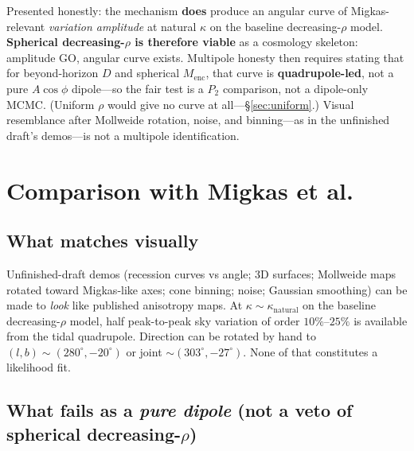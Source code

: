 \documentclass[11pt,a4paper]{article}
\begin{document}
Presented honestly: the mechanism \textbf{does} produce an angular curve of Migkas-relevant \emph{variation amplitude} at natural \(\kappa\) on the baseline decreasing-\(\rho\) model. \textbf{Spherical decreasing-\(\rho\) is therefore viable} as a cosmology skeleton: amplitude GO, angular curve exists. Multipole honesty then requires stating that for beyond-horizon \(D\) and spherical \(M_{\mathrm{enc}}\), that curve is \textbf{quadrupole-led}, not a pure \(A\cos\phi\) dipole---so the fair test is a \(P_2\) comparison, not a dipole-only MCMC. (Uniform \(\rho\) would give no curve at all---\S\ref{sec:uniform}.) Visual resemblance after Mollweide rotation, noise, and binning---as in the unfinished draft's demos---is not a multipole identification.

\section{Comparison with Migkas et al.}

\subsection{What matches visually}

Unfinished-draft demos (recession curves vs angle; 3D surfaces; Mollweide maps rotated toward Migkas-like axes; cone binning; noise; Gaussian smoothing) can be made to \emph{look} like published anisotropy maps. At \(\kappa\sim\kappa_{\mathrm{natural}}\) on the baseline decreasing-\(\rho\) model, half peak-to-peak sky variation of order \(10\%\)--\(25\%\) is available from the tidal quadrupole. Direction can be rotated by hand to \((l,b)\sim(280^\circ,-20^\circ)\) or joint \(\sim(303^\circ,-27^\circ)\). None of that constitutes a likelihood fit.

\subsection{What fails as a \emph{pure dipole} (not a veto of spherical decreasing-\(\rho\))}
\end{document}
